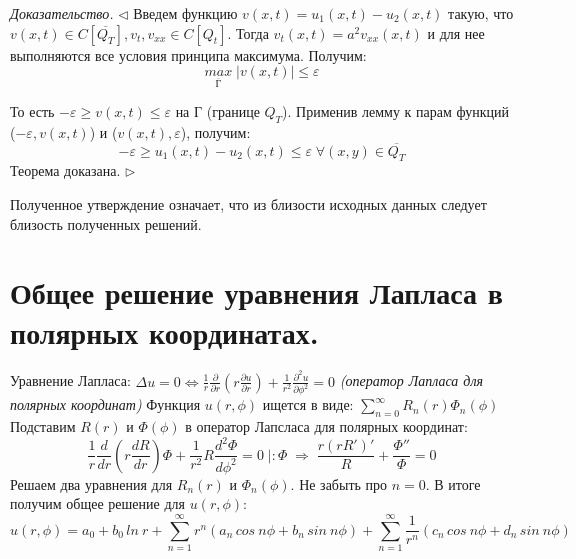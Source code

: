 \documentclass[11pt,a4paper]{article}
\begin{document}
    \textit{Доказательство.} $\triangleleft$ Введем функцию $v(x,t) = u_1(x,t) - u_2(x,t)$ такую, что $v(x,t) \in C[\overline{Q_T}], v_t, v_{xx} \in C[Q_t]$. Тогда $v_t(x,t) = a^2v_{xx}(x,t)$ и для нее выполняются все условия принципа максимума. Получим:
    $$
    \underset{\overline{Г}}{max} \; |v(x,t)| \leqslant \varepsilon
    $$
    
    То есть $-\varepsilon \geqslant v(x,t) \leqslant \varepsilon$ на Г (границе $Q_T$). Применив лемму к парам функций ($-\varepsilon, v(x,t)$) и ($v(x,t), \varepsilon$), получим:
    $$
    -\varepsilon \geqslant u_1(x,t) - u_2(x,t) \leqslant \varepsilon \; \forall (x,y) \in \overline{Q_T}
    $$
    Теорема доказана. $\triangleright$
    
    Полученное утверждение означает, что из близости исходных данных следует близость полученных
решений.
    
    \section{Общее решение уравнения Лапласа в полярных координатах.}
    Уравнение Лапласа: $\Delta u = 0 \Leftrightarrow \frac{1}{r} \frac{\partial}{\partial r}(r \frac{\partial u}{\partial r}) + \frac{1}{r^2} \frac{\partial^2 u}{\partial \phi^2} = 0$ \textit{(оператор Лапласа для полярных координат)}
    Функция $u(r,\phi)$ ищется в виде: $\sum\limits_{n=0}^{\infty} R_n(r)\Phi_n(\phi)$
    Подставим $R(r)$ и $\Phi(\phi)$ в оператор Лапсласа для полярных координат:
    $$
    \frac{1}{r} \frac{d}{dr}(r \frac{dR}{dr})\Phi + \frac{1}{r^2} R \frac{d^2 \Phi}{d \phi^2} = 0 \; |:\Phi \; \Rightarrow \;
    \frac{r(rR')'}{R} + \frac{\Phi''}{\Phi} = 0
    $$
    Решаем два уравнения для $R_n(r)$ и $\Phi_n(\phi)$. Не забыть про $n = 0$. В итоге получим общее решение для $u(r, \phi)$:
    $$
    u(r, \phi) = a_0 + b_0 \, ln\:r + \sum\limits_{n=1}^{\infty}r^n(a_n \, cos \: n \phi + b_n \, sin \: n \phi) + \sum\limits_{n=1}^{\infty}\frac{1}{r^n}(c_n \, cos \: n \phi + d_n \, sin \: n \phi)
    $$
    
\end{document}
